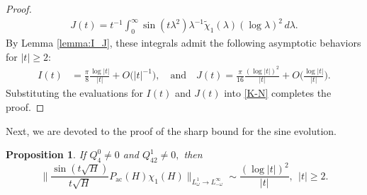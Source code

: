 \documentclass[reqno]{amsart}
\newtheorem{proposition}[theorem]{Proposition}
\numberwithin{equation}{section}
\begin{document}
\begin{proof}
\begin{align*}
		J(t) = t^{-1}\int_0^\infty \sin(t\lambda^2) \lambda^{-1} \widetilde{\chi}_1(\lambda) (\log \lambda)^2 \, d\lambda.
	\end{align*}
	By Lemma \ref{lemma:I_J}, these integrals admit the following asymptotic behaviors for $|t| \ge 2$:
	\begin{align*}    
		I(t) &= \frac{\pi}{8} \frac{\log |t|}{|t|} + {O}\big(|t|^{-1}\big), \quad \text{and} \quad J(t) = \frac{\pi}{16} \frac{(\log |t|)^2}{|t|} + {O}\Big(\frac{\log |t|}{|t|}\Big).
	\end{align*}
    Substituting the evaluations for $I(t)$ and $J(t)$ into \eqref{K-N} completes the proof.
\end{proof}


Next, we are devoted to the proof of the sharp bound for the sine evolution.

\begin{proposition}\label{sine-sharp}
	If $Q_4^0 \neq 0$ and $Q_{42}^1 \neq 0,$  then
\begin{equation}\label{optimality_0}
	\Big\|\frac{\sin (t \sqrt{H})}{t\sqrt{H}} P_{\mathrm{ac}}(H)\chi_1(H)\Big\|_{L^1_\omega \to L^{\infty}_{-\omega}} \sim \frac{(\log |t|)^2}{|t|},\ \ |t|\ge2.
\end{equation}  
\end{proposition}
\end{document}
